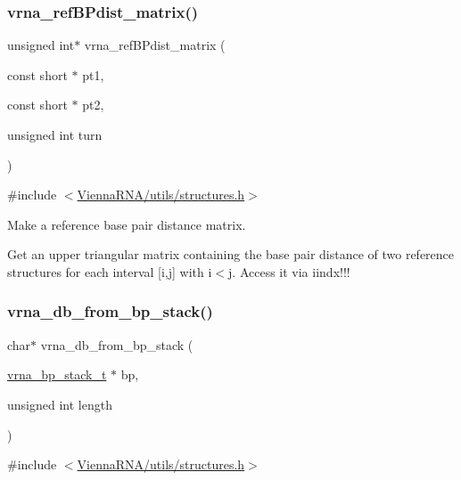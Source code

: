 \subsubsection{\texorpdfstring{vrna\+\_\+ref\+B\+Pdist\+\_\+matrix()}{vrna\_refBPdist\_matrix()}}
{\footnotesize\ttfamily unsigned int$\ast$ vrna\+\_\+ref\+B\+Pdist\+\_\+matrix (\begin{DoxyParamCaption}\item[{const short $\ast$}]{pt1,  }\item[{const short $\ast$}]{pt2,  }\item[{unsigned int}]{turn }\end{DoxyParamCaption})}



{\ttfamily \#include $<$\hyperlink{utils_2structures_8h}{Vienna\+R\+N\+A/utils/structures.\+h}$>$}



Make a reference base pair distance matrix. 

Get an upper triangular matrix containing the base pair distance of two reference structures for each interval \mbox{[}i,j\mbox{]} with i$<$j. Access it via iindx!!! \mbox{\label{group__struct__utils_ga27bea2c241564af53a065982183389df}} 
\subsubsection{\texorpdfstring{vrna\+\_\+db\+\_\+from\+\_\+bp\+\_\+stack()}{vrna\_db\_from\_bp\_stack()}}
{\footnotesize\ttfamily char$\ast$ vrna\+\_\+db\+\_\+from\+\_\+bp\+\_\+stack (\begin{DoxyParamCaption}\item[{\hyperlink{group__data__structures_gaa651bda42e7692f08cb603cd6834b0ee}{vrna\+\_\+bp\+\_\+stack\+\_\+t} $\ast$}]{bp,  }\item[{unsigned int}]{length }\end{DoxyParamCaption})}



{\ttfamily \#include $<$\hyperlink{utils_2structures_8h}{Vienna\+R\+N\+A/utils/structures.\+h}$>$}



